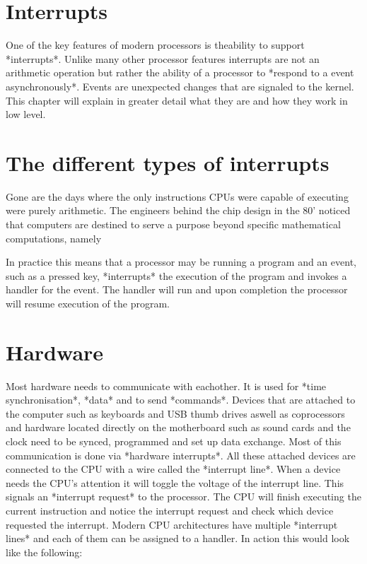 \section{Interrupts}

One of the key features of modern processors is theability to support *interrupts*.
Unlike many other processor features interrupts are not an arithmetic operation but
rather the ability of a processor to *respond to a event asynchronously*. Events are
unexpected changes that are signaled to the kernel. This chapter will explain in
greater detail what they are and how they work in low level.

\section{The different types of interrupts}

Gone are the days where the only instructions CPUs were capable of executing were
purely arithmetic. The engineers behind the chip design in the 80' noticed that
computers are destined to serve a purpose beyond specific mathematical computations,
namely

In
practice this means that a processor may be running a program and an event, such as a pressed
key, *interrupts* the execution of the program and invokes a handler for the event. The
handler will run and upon completion the processor will resume execution of the program.

\section{Hardware}

Most hardware needs to communicate with eachother. It is used for *time synchronisation*,
*data* and to send *commands*. Devices that are attached to the computer such as keyboards 
and USB thumb drives aswell as coprocessors and hardware located directly on the 
motherboard such as sound cards and the clock need to be synced, programmed and set up data
exchange. Most of this communication is done via *hardware interrupts*. All these attached
devices are connected to the CPU with a wire called the *interrupt line*. When a device needs the CPU's 
attention it will toggle the voltage of the interrupt line. This signals an *interrupt request* to the
processor. The CPU will finish executing the current instruction and notice the interrupt request and
check which device requested the interrupt. Modern CPU architectures have multiple *interrupt lines*
and each of them can be assigned to a handler. In action this would look like the following:


